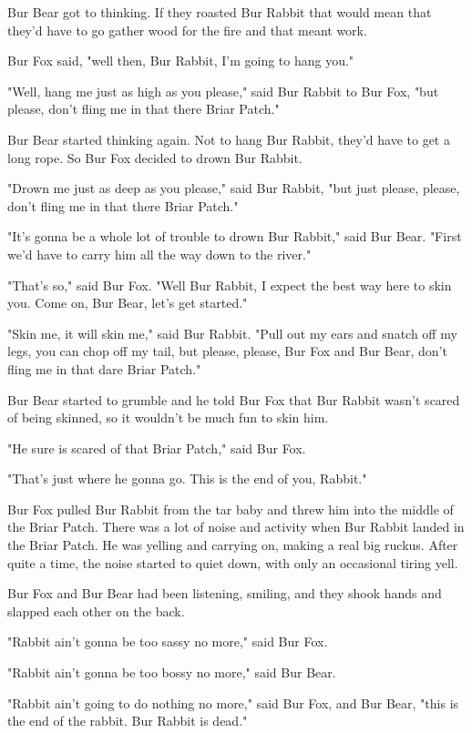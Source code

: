 Bur Bear got to thinking. If they roasted Bur Rabbit that would mean that they'd have to go gather wood for the fire and that meant work.

Bur Fox said, "well then, Bur Rabbit, I'm going to hang you."

"Well, hang me just as high as you please," said Bur Rabbit to Bur Fox, "but please, don't fling me in that there Briar Patch."

Bur Bear started thinking again. Not to hang Bur Rabbit, they'd have to get a long rope. So Bur Fox decided to drown Bur Rabbit.

"Drown me just as deep as you please," said Bur Rabbit, "but just please, please, don't fling me in that there Briar Patch."

"It's gonna be a whole lot of trouble to drown Bur Rabbit," said Bur Bear. "First we'd have to carry him all the way down to the river."

"That's so," said Bur Fox. "Well Bur Rabbit, I expect the best way here to skin you. Come on, Bur Bear, let's get started."

"Skin me, it will skin me," said Bur Rabbit. "Pull out my ears and snatch off my legs, you can chop off my tail, but please, please, Bur Fox and Bur Bear, don't fling me in that dare Briar Patch."

Bur Bear started to grumble and he told Bur Fox that Bur Rabbit wasn't scared of being skinned, so it wouldn't be much fun to skin him.

"He sure is scared of that Briar Patch," said Bur Fox.

"That's just where he gonna go. This is the end of you, Rabbit."

Bur Fox pulled Bur Rabbit from the tar baby and threw him into the middle of the Briar Patch. There was a lot of noise and activity when Bur Rabbit landed in the Briar Patch. He was yelling and carrying on, making a real big ruckus. After quite a time, the noise started to quiet down, with only an occasional tiring yell.

Bur Fox and Bur Bear had been listening, smiling, and they shook hands and slapped each other on the back.

"Rabbit ain't gonna be too sassy no more," said Bur Fox.

"Rabbit ain't gonna be too bossy no more," said Bur Bear.

"Rabbit ain't going to do nothing no more," said Bur Fox, and Bur Bear, "this is the end of the rabbit. Bur Rabbit is dead."

